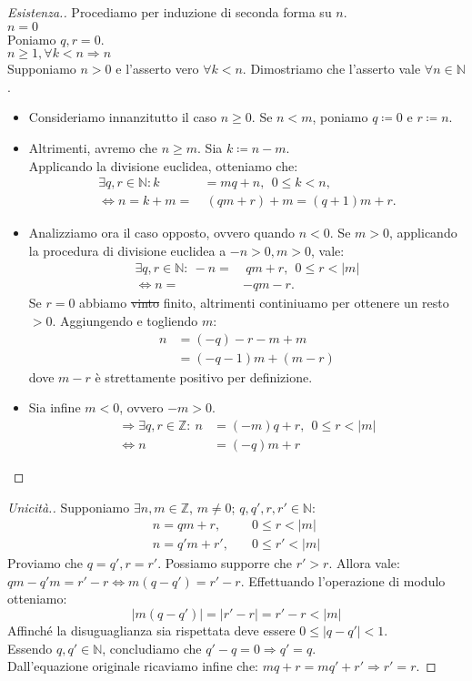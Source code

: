 \documentclass[12pt,twoscolu]{article}
\newcommand{\N}{\mathbb{N}}
\newcommand{\Z}{\mathbb{Z}}
\newcommand{\sesolose}{\Leftrightarrow}
\newcommand{\implica}{\Longrightarrow}
\newcommand{\nin}{\forall n\in\N}
\renewcommand\qedsymbol{$\blacksquare$}
\newcommand{\baseinduz}[1]{\\[1\baselineskip]{\boldmath$n = #1$}}
\newcommand{\induzdue}[1]{\\[1\baselineskip]{\boldmath$n \ge #1, \forall k < n \implica n$}}
\begin{document}
\renewcommand\qedsymbol{$\square$}
\begin{proof}[Esistenza.]
Procediamo per induzione di seconda forma su $n$.
\baseinduz{0}
\\Poniamo $q, r = 0$.
\induzdue{1}
\\Supponiamo $n > 0$ e l'asserto vero $\forall k < n$. Dimostriamo che l'asserto vale $\nin$.
\begin{itemize}
\item Consideriamo innanzitutto il caso $n \ge 0$. Se $n < m$, poniamo $q \coloneqq 0$ e $ r \coloneqq n$.
\item Altrimenti, avremo che $n \ge m$. Sia $k \coloneqq n - m$.\\Applicando la divisione euclidea, otteniamo che:
\begin{align*}
\exists q, r \in \N : k &= mq + n, \ \ 0 \le k <n, \\
\sesolose n = k + m =&\ (qm + r) + m = (q+1) m + r.
\end{align*}
\item Analizziamo ora il caso opposto, ovvero quando $n < 0$. Se $m > 0$, applicando la procedura di divisione euclidea a $-n > 0, m >0$, vale:
\begin{align*}
\exists q, r \in \N:\ -n =&  \ qm + r, \ \ 0 \le r < |m| \\
\sesolose n =& - qm - r.
\end{align*}
Se $ r = 0$ abbiamo \sout{vinto} finito, altrimenti continiuamo per ottenere un resto $> 0$. Aggiungendo e togliendo $m$:
\begin{align*}
n &= (-q)-r-m+m \\
&= (-q-1)m+(m-r)
\end{align*}
dove $m-r$ è strettamente positivo per definizione.
\item Sia infine $m < 0$, ovvero $-m > 0$.
\begin{align*}
\implica \exists q, r \in \Z:\ n &= (-m)q + r, \ \ 0 \le r < |m| \\
 \sesolose n &= (-q)m + r 
\end{align*}
\end{itemize}
\end{proof}
\renewcommand\qedsymbol{$\blacksquare$}
\begin{proof}[Unicità.]
Supponiamo $\exists n, m \in \Z$, $m \ne 0$; $q, q', r, r' \in \N$:
\begin{align*}
n = qm + r,& \quad 0 \le r < |m| \\
n = q'm + r',& \quad 0 \le r' < |m|
\end{align*}
Proviamo che $ q = q', r = r'$. Possiamo supporre che $r' > r$. Allora vale:
\\$ qm - q'm = r' - r \sesolose m(q-q') = r'-r$. Effettuando l'operazione di modulo otteniamo:
$$ |m(q-q')| = |r' - r| = r' - r < |m|$$
Affinché la disuguaglianza sia rispettata deve essere $ 0 \le |q-q'| < 1 $.
\\ Essendo $q, q' \in \N$, concludiamo che $q' - q = 0 \implica q' = q$.
\\ Dall'equazione originale ricaviamo infine che: $mq + r = mq' + r' \implica r' = r$.
\end{proof}
\end{document}
